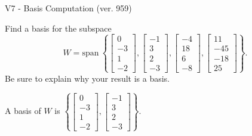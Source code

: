 \begin{exercise}
  \begin{exerciseTitle}V7 - Basis Computation (ver. 959)\end{exerciseTitle}
  \begin{exerciseStatement}
    Find a basis for the subspace 
\[W=\mathrm{span}\ \left\{\left[\begin{array}{r}
0 \\
-3 \\
1 \\
-2
\end{array}\right] , \left[\begin{array}{r}
-1 \\
3 \\
2 \\
-3
\end{array}\right] , \left[\begin{array}{r}
-4 \\
18 \\
6 \\
-8
\end{array}\right] , \left[\begin{array}{r}
11 \\
-45 \\
-18 \\
25
\end{array}\right]\right\}.\]
 Be sure to explain why your result is a basis.


  \end{exerciseStatement}
  \begin{exerciseAnswer}
   A basis of \(W\) is  \(\left\{\left[\begin{array}{r}
0 \\
-3 \\
1 \\
-2
\end{array}\right] , \left[\begin{array}{r}
-1 \\
3 \\
2 \\
-3
\end{array}\right]\right\}\).
  


  \end{exerciseAnswer}
\end{exercise}